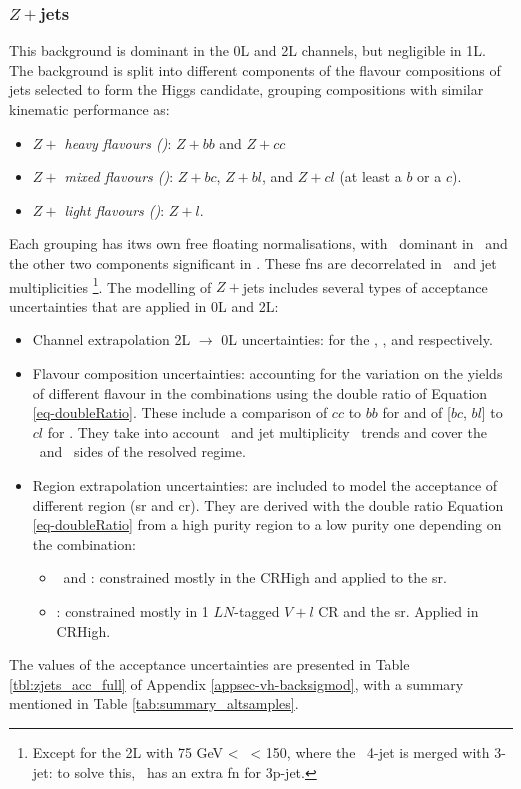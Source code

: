 \subsubsection{$Z+$jets}
This background is dominant in the 0L and 2L channels, but negligible in 1L. The background is split into different components of the flavour compositions of jets selected to form the Higgs candidate, grouping compositions with similar kinematic performance as:   
\begin{itemize}
    \item \textit{$Z+$ heavy flavours (\zhf)}: $Z+bb$ and $Z+cc$
    \item \textit{$Z+$ mixed flavours (\zmf)}: $Z+bc$, $Z+bl$, and $Z+cl$ (at least a $b$ or a $c$).
    \item \textit{$Z+$ light flavours (\zlf)}: $Z+l$.
\end{itemize}
Each grouping has itws own free floating normalisations, with \zhf\ dominant in \vhb\ and the other two components significant in \vhc. These \gls{fn}s are decorrelated in \ptv\ and jet multiplicities \nj\footnote{Except for the 2L with 75 GeV < \ptv\ < 150, where the \vhb\ 4-jet is merged with 3-jet: to solve this, \vhb\ has an extra \zhf \gls{fn} for 3p-jet.}. The modelling of $Z+$jets includes several types of acceptance uncertainties that are applied in 0L and 2L:
\begin{itemize}[leftmargin=*]
    \item Channel extrapolation 2L $\rightarrow$ 0L uncertainties: for the \zhf, \zmf, and \zlf respectively. 
    \item Flavour composition uncertainties: accounting for the variation on the yields of different flavour in the combinations using the double ratio of Equation \ref{eq-doubleRatio}. These include a comparison of $cc$ to $bb$ for \zhf and of [$bc$, $bl$] to $cl$ for \zmf. They take into account \ptv\ and jet multiplicity \nj\ trends and cover the \vhb\ and \vhc\ sides of the resolved regime. 
    \item Region extrapolation uncertainties: are included to model the acceptance of different region (\gls{sr} and \gls{cr}). They are derived with the double ratio Equation \ref{eq-doubleRatio} from a high purity region to a low purity one depending on the combination:
    \begin{itemize}
        \item \zhf\ and \zmf: constrained mostly in the CRHigh and applied to the \gls{sr}. 
        \item \zlf: constrained mostly in 1 $LN$-tagged $V+l$ CR and the \gls{sr}. Applied in CRHigh. %
    \end{itemize}
\end{itemize}
The values of the acceptance uncertainties are presented in Table \ref{tbl:zjets_acc_full} of Appendix \ref{appsec-vh-backsigmod}, with a summary mentioned in Table \ref{tab:summary_altsamples}.


